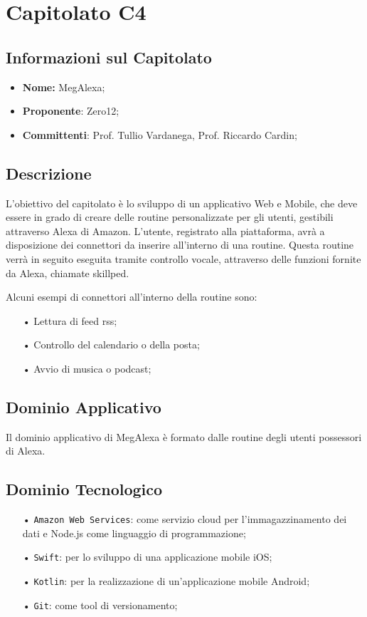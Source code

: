 \section{Capitolato C4}
\subsection{Informazioni sul Capitolato}
\begin{itemize}
	\item \textbf{Nome:} MegAlexa;
	\item \textbf{Proponente}: Zero12;
	\item \textbf{Committenti}: Prof. Tullio Vardanega, Prof. Riccardo Cardin;
\end{itemize}

\subsection{Descrizione}
L'obiettivo del capitolato è lo sviluppo di un applicativo Web e Mobile, che deve essere in grado di creare delle routine personalizzate per gli utenti, gestibili attraverso Alexa di Amazon.
L'utente, registrato alla piattaforma, avrà a disposizione dei {connettori} da inserire all'interno di una routine. Questa routine verrà in seguito eseguita tramite controllo vocale, attraverso delle funzioni fornite da Alexa, chiamate {skillped}.

Alcuni esempi di connettori all'interno della routine sono:
\begin{itemize}
\item[•] Lettura di feed {rss};
\item[•] Controllo del calendario o della posta;
\item[•] Avvio di musica o podcast;
\end{itemize}

\subsection{Dominio Applicativo}
Il dominio applicativo di MegAlexa è formato dalle routine degli utenti possessori di Alexa.

\subsection{Dominio Tecnologico}
\begin{itemize}

\item[•] \texttt{Amazon Web Services}: come servizio cloud per l'immagazzinamento dei dati e Node.js come linguaggio di programmazione;
\item[•] \texttt{Swift}: per lo sviluppo di una applicazione mobile iOS;
\item[•] \texttt{Kotlin}: per la realizzazione di un'applicazione mobile Android;
\item[•] \texttt{Git}: come tool di versionamento;

\end{itemize}

